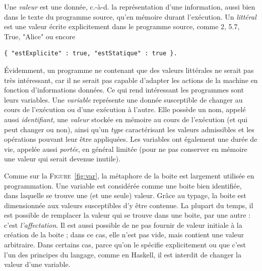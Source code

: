 \documentclass[a4paper,francais]{insalyon}
\newcommand{\cad}{c.-à-d.}
\begin{document}
Une \emph{valeur} est une donnée, {\cad} la représentation d'une information, aussi bien dans le texte du programme source, qu'en mémoire durant l'exécution. 
Un \emph{littéral} est une valeur écrite explicitement dans le programme source, comme 2, 5.7, True, "Alice" ou encore
\begin{verbatim}
{ "estExplicite" : true, "estStatique" : true }.
\end{verbatim}
\'Evidemment, un programme ne contenant que des valeurs littérales ne serait pas très intéressant, car il ne serait pas capable d'adapter les actions de la machine en fonction d'informations données. Ce qui rend intéressant les programmes sont leurs variables. 
Une \emph{variable} représente une donnée susceptible de changer au cours de l'exécution ou d'une exécution à l'autre. Elle possède un nom, appelé aussi \emph{identifiant}, une \emph{valeur} stockée en mémoire au cours de l'exécution (et qui peut changer ou non), ainsi qu'un \emph{type} caractérisant les valeurs admissibles et les opérations pouvant leur être appliquées. Les variables ont également une durée de vie, appelée aussi \emph{portée}, en général limitée (pour ne pas conserver en mémoire une valeur qui serait devenue inutile).  

Comme sur la \textsc{Figure}~\ref{fig:var}, la métaphore de la boite est largement utilisée en programmation. Une variable est considérée comme une boite bien identifiée, dans laquelle se trouve une (et une seule) valeur. Grâce au typage, la boite est dimensionnée aux valeurs susceptibles d'y être contenue. La plupart du temps, il est possible de remplacer la valeur qui se trouve dans une boite, par une autre : c'est \emph{l'affectation}. Il est aussi possible de ne pas fournir de valeur initiale à la création de la boite ; dans ce cas, elle n'est pas vide, mais contient une valeur arbitraire. Dans certains cas, parce qu'on le spécifie explicitement ou que c'est l'un des principes du langage, comme en Haskell, il est interdit de changer la valeur d'une variable.
\end{document}

